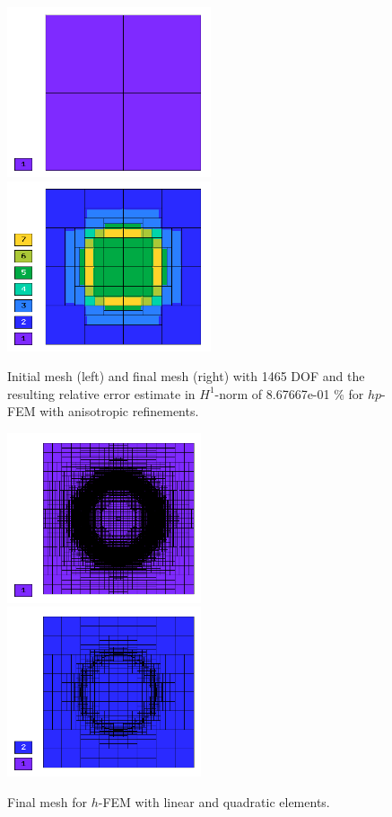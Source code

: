 \documentclass[12pt]{elsarticle}
\begin{document}
\begin{figure}[!ht]
\centering
\includegraphics[height=5cm]{nist/nist-9/mesh_hp_aniso_init.png}\ \
\includegraphics[height=5cm]{nist/nist-9/mesh_hp_aniso.png}
\caption{Initial mesh (left) and final mesh (right) with 1465 DOF and the resulting relative error estimate in $H^1$-norm of 8.67667e-01 \% for $hp$-FEM with anisotropic refinements.}
\label{fig:nist-9-hp-aniso}
\end{figure}

\begin{figure}[!ht]
\centering
\includegraphics[height=5cm]{nist/nist-9/mesh_h1_aniso.png}\ \
\includegraphics[height=5cm]{nist/nist-9/mesh_h2_aniso.png}
\caption{Final mesh for $h$-FEM with linear and quadratic elements.}
\label{fig:nist-9-h-aniso}
\end{figure}
\end{document}
